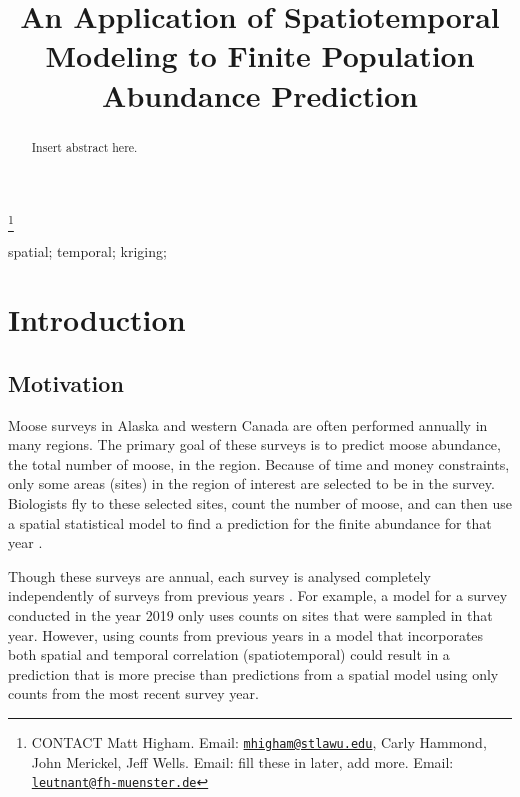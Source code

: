 \documentclass[]{interact}
\theoremstyle{plain}%
\theoremstyle{definition}
\theoremstyle{remark}
\begin{document}

\title{An Application of Spatiotemporal Modeling to Finite Population
Abundance Prediction}


\author{
}

\thanks{CONTACT Matt
Higham. Email: \href{mailto:mhigham@stlawu.edu}{\nolinkurl{mhigham@stlawu.edu}}, Carly
Hammond, John Merickel, Jeff Wells. Email: fill these in later, add
more. Email: \href{mailto:leutnant@fh-muenster.de}{\nolinkurl{leutnant@fh-muenster.de}}}

\maketitle

\begin{abstract}
Insert abstract here.
\end{abstract}

\begin{keywords}
spatial; temporal; kriging;
\end{keywords}

\section{Introduction}

\subsection{Motivation}

Moose surveys in Alaska and western Canada are often performed annually
in many regions. The primary goal of these surveys is to predict moose
abundance, the total number of moose, in the region. Because of time and
money constraints, only some areas (sites) in the region of interest are
selected to be in the survey. Biologists fly to these selected sites,
count the number of moose, and can then use a spatial statistical model
to find a prediction for the finite abundance for that year
\citep{ver2008spatial}.

Though these surveys are annual, each survey is analysed completely
independently of surveys from previous years
\citep[e.g.][]{gasaway1986estimating, kellie_geospatial_2006, boertje2009managing, peters2014contrasting}.
For example, a model for a survey conducted in the year 2019 only uses
counts on sites that were sampled in that year. However, using counts
from previous years in a model that incorporates both spatial and
temporal correlation (spatiotemporal) could result in a prediction that
is more precise than predictions from a spatial model using only counts
from the most recent survey year.
\end{document}
